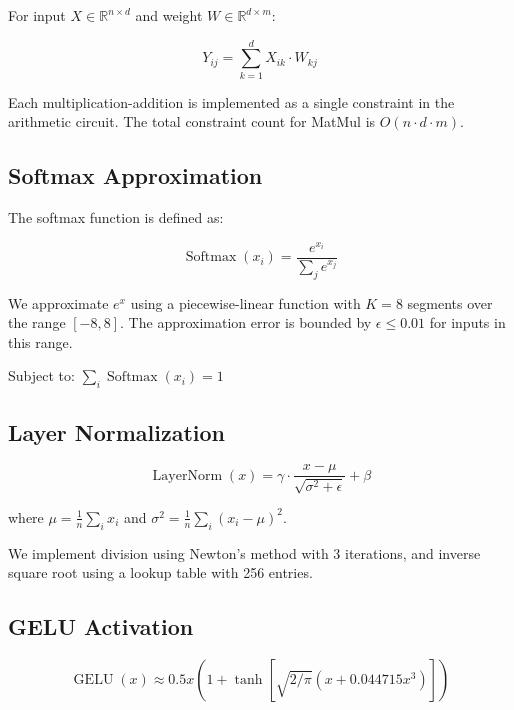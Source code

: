 \documentclass{article}
\begin{document}
For input $X \in \mathbb{R}^{n \times d}$ and weight $W \in \mathbb{R}^{d \times m}$:

\begin{equation}
    Y_{ij} = \sum_{k=1}^{d} X_{ik} \cdot W_{kj}
\end{equation}

Each multiplication-addition is implemented as a single constraint in the arithmetic circuit.
The total constraint count for MatMul is $O(n \cdot d \cdot m)$.

\subsection{Softmax Approximation}

The softmax function is defined as:

\begin{equation}
    \operatorname{Softmax}(x_i) = \frac{e^{x_i}}{\sum_{j} e^{x_j}}
\end{equation}

We approximate $e^x$ using a piecewise-linear function with $K=8$ segments over the
range $[-8, 8]$. The approximation error is bounded by $\epsilon \leq 0.01$ for inputs
in this range.

Subject to: $\sum_i \operatorname{Softmax}(x_i) = 1$

\subsection{Layer Normalization}

\begin{equation}
    \operatorname{LayerNorm}(x) = \gamma \cdot \frac{x - \mu}{\sqrt{\sigma^2 + \epsilon}} + \beta
\end{equation}

where $\mu = \frac{1}{n}\sum_{i} x_i$ and $\sigma^2 = \frac{1}{n}\sum_i (x_i - \mu)^2$.

We implement division using Newton's method with 3 iterations, and inverse square root
using a lookup table with 256 entries.

\subsection{GELU Activation}

\begin{equation}
    \operatorname{GELU}(x) \approx 0.5x\left(1 + \tanh\left[\sqrt{2/\pi}(x + 0.044715x^3)\right]\right)
\end{equation}
\end{document}
